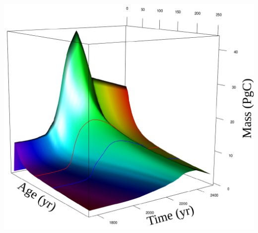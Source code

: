 \begin{columns}
\begin{column}{\rc}
\begin{minipage}[t]{\textwidth}
			\includegraphics[width=0.9\rc]{images/content/3D.pdf}
		\end{minipage}
	\end{column}
\end{columns}
